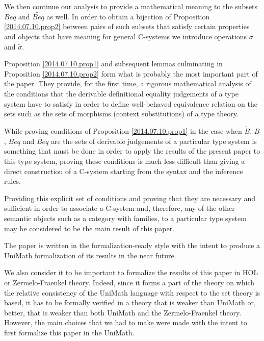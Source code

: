 \documentclass[11pt]{article}
\newcommand{\wt}{\widetilde}
\begin{document}
We then continue our analysis to provide a mathematical meaning to the subsets ${Beq}$ and ${\wt{Beq}}$ as well. In order to obtain a bijection of Proposition \ref{2014.07.10.prop2} between pairs of such subsets that satisfy certain properties and objects that have meaning for general C-systems we introduce operations $\sigma$ and $\wt{\sigma}$. 

Proposition \ref{2014.07.10.prop1} and subsequent lemmas culminating in Proposition \ref{2014.07.10.prop2} form what is probably the most important part of the paper. They provide, for the first time, a rigorous mathematical analysis of the conditions that the derivable definitional equality judgements of a type system have to satisfy in order to define well-behaved equivalence relation on the sets such as the sets of morphisms (context substitutions) of a type theory. 

While proving conditions of Proposition \ref{2014.07.10.prop1} in the case when ${\wt{B}}$, ${B}$, ${Beq}$ and ${\wt{Beq}}$ are the sets of derivable judgements of a particular type system is something that must be done in order to apply the results of the present paper to this type system, proving these conditions is much less difficult than giving a direct construction of a C-system starting from the syntax and the inference rules.

Providing this explicit set of conditions and proving that they are necessary and sufficient in order to associate a C-system and, therefore, any of the other semantic objects such as a category with families, to a particular type system may be considered to be the main result of this paper. 

\vspace{5mm}

The paper is written in the formalization-ready style with the intent to produce a UniMath formalization of its results in the near future. 

We also consider it to be important to formalize the results of this paper in HOL or Zermelo-Fraenkel theory. Indeed, since it forms a part of the theory on which the relative consistency of the UniMath language with respect to the set theory is based, it has to be formally verified in a theory that is weaker than UniMath or, better, that is weaker than both UniMath and the Zermelo-Fraenkel theory. However, the main choices that we had to make were made with the intent to first formalize this paper in the UniMath.

\vspace{5mm}
\end{document}
